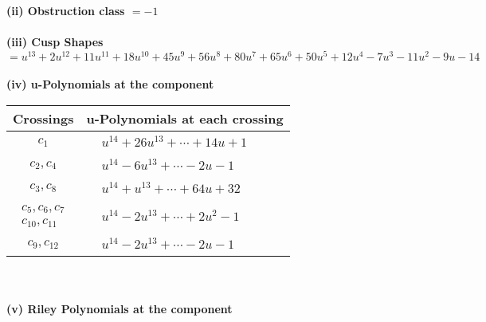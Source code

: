 \documentclass[1p]{elsarticle_modified}
\theoremstyle{definition}
\begin{document}
\flushleft \textbf{(ii) Obstruction class $= -1$}\\~\\
\flushleft \textbf{(iii) Cusp Shapes $= u^{13}+2 u^{12}+11 u^{11}+18 u^{10}+45 u^9+56 u^8+80 u^7+65 u^6+50 u^5+12 u^4-7 u^3-11 u^2-9 u-14$}\\~\\
\newpage\renewcommand{\arraystretch}{1}
\flushleft \textbf{(iv) u-Polynomials at the component}\newline \\
\begin{tabular}{m{50pt}|m{274pt}}
Crossings & \hspace{64pt}u-Polynomials at each crossing \\
\hline $$\begin{aligned}c_{1}\end{aligned}$$&$\begin{aligned}
&u^{14}+26 u^{13}+\cdots+14 u+1
\end{aligned}$\\
\hline $$\begin{aligned}c_{2},c_{4}\end{aligned}$$&$\begin{aligned}
&u^{14}-6 u^{13}+\cdots-2 u-1
\end{aligned}$\\
\hline $$\begin{aligned}c_{3},c_{8}\end{aligned}$$&$\begin{aligned}
&u^{14}+u^{13}+\cdots+64 u+32
\end{aligned}$\\
\hline $$\begin{aligned}c_{5},c_{6},c_{7}\\c_{10},c_{11}\end{aligned}$$&$\begin{aligned}
&u^{14}-2 u^{13}+\cdots+2 u^2-1
\end{aligned}$\\
\hline $$\begin{aligned}c_{9},c_{12}\end{aligned}$$&$\begin{aligned}
&u^{14}-2 u^{13}+\cdots-2 u-1
\end{aligned}$\\
\hline
\end{tabular}\\~\\
\newpage\renewcommand{\arraystretch}{1}
\flushleft \textbf{(v) Riley Polynomials at the component}\newline \\
\end{document}
